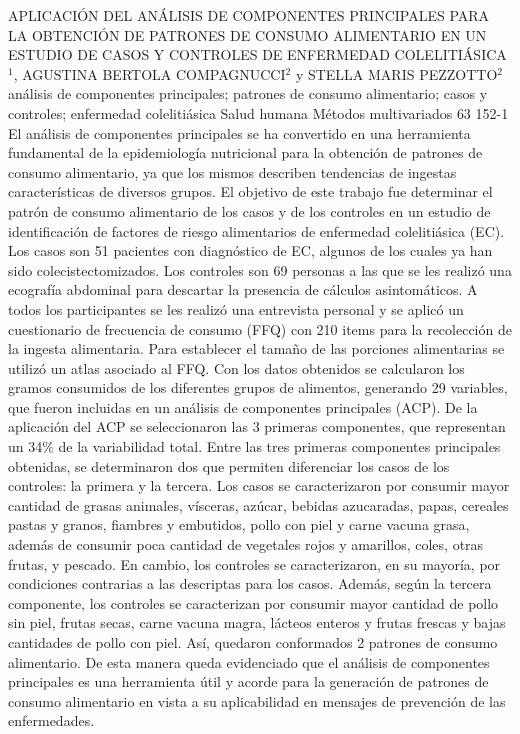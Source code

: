 \A
{APLICACIÓN DEL ANÁLISIS DE COMPONENTES PRINCIPALES PARA LA OBTENCIÓN DE PATRONES DE CONSUMO ALIMENTARIO EN UN ESTUDIO DE CASOS Y CONTROLES DE ENFERMEDAD COLELITIÁSICA}
{$^1$, AGUSTINA BERTOLA COMPAGNUCCI$^2$ y STELLA MARIS PEZZOTTO$^2$}
{
\\}
{análisis de componentes principales; patrones de consumo alimentario; casos y controles; enfermedad colelitiásica} 
 {Salud humana} 
 {Métodos multivariados} 
 {63} 
 {152-1}
{El análisis de componentes principales se ha convertido en una herramienta fundamental de la epidemiología nutricional para la obtención de patrones de consumo alimentario, ya que los mismos describen tendencias de ingestas características de diversos grupos. El objetivo de este trabajo fue determinar el patrón de consumo alimentario de los casos y de los controles en un estudio de identificación de factores de riesgo alimentarios de enfermedad colelitiásica (EC). Los casos son 51 pacientes con diagnóstico de EC, algunos de los cuales ya han sido colecistectomizados. Los controles son 69 personas a las que se les realizó una ecografía abdominal para descartar la presencia de cálculos asintomáticos. A todos los participantes se les realizó una entrevista personal y se aplicó un cuestionario de frecuencia de consumo (FFQ) con 210 items para la recolección de la ingesta alimentaria. Para establecer el tamaño de las porciones alimentarias se utilizó un atlas asociado al FFQ. Con los datos obtenidos se calcularon los gramos consumidos de los diferentes grupos de alimentos, generando 29 variables, que fueron incluidas en un análisis de componentes principales (ACP). De la aplicación del ACP se seleccionaron las 3 primeras componentes, que representan un 34\% de la variabilidad total. Entre las tres primeras componentes principales obtenidas, se determinaron dos que permiten diferenciar los casos de los controles: la primera y la tercera. Los casos se caracterizaron por consumir mayor cantidad de grasas animales, vísceras, azúcar, bebidas azucaradas, papas, cereales pastas y granos, fiambres y embutidos, pollo con piel y carne vacuna grasa, además de consumir poca cantidad de vegetales rojos y amarillos, coles, otras frutas, y pescado. En cambio, los controles se caracterizaron, en su mayoría, por condiciones contrarias a las descriptas para los casos. Además, según la tercera componente, los controles se caracterizan por consumir mayor cantidad de pollo sin piel, frutas secas, carne vacuna magra, lácteos enteros y frutas frescas y bajas cantidades de pollo con piel. Así, quedaron conformados 2 patrones de consumo alimentario. De esta manera queda evidenciado que el análisis de componentes principales es una herramienta útil y acorde para la generación de patrones de consumo alimentario en vista a su aplicabilidad en mensajes de prevención de las enfermedades. }
